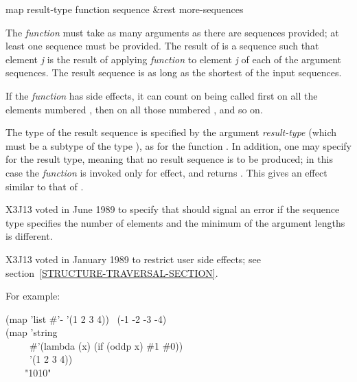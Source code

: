 \begin{defun}[Function]
map result-type function sequence &rest more-sequences

The \emph{function} must take as many arguments as there are sequences
provided; at least one sequence must be provided.
The result of  is a sequence such that element \emph{j} is the result
of applying \emph{function} to element \emph{j} of each of the argument
sequences.  The result sequence is as long as the shortest of the
input sequences.

If the \emph{function} has side effects, it can count on being called
first on all the elements numbered , then on all those
numbered , and so on.

The type of the result sequence is specified by the argument \emph{result-type}
(which must be a subtype of the type ),
as for the function .
In addition, one may specify {\nil} for the result type, meaning that no
result sequence is to be produced; in this case the \emph{function} is invoked
only for effect, and  returns {\nil}.  This gives an effect similar
to that of .

\begin{newer}
X3J13 voted in June 1989  to specify that
 should signal an error if the sequence type specifies the number of
elements and the minimum of the argument lengths is different.
\end{newer}

\begin{new}
X3J13 voted in January 1989
to restrict user side effects; see section~\ref{STRUCTURE-TRAVERSAL-SECTION}.
\end{new}

\noindent
For example:
\begin{lisp}
(map 'list \#'- '(1 2 3 4)) \EV\ (-1 -2 -3 -4) \\
(map 'string \\
~~~~~\#'(lambda (x) (if (oddp x) \#{\Xbackslash}1 \#{\Xbackslash}0)) \\
~~~~~'(1 2 3 4)) \\
~~~\EV\ "1010"
\end{lisp}
\end{defun}


